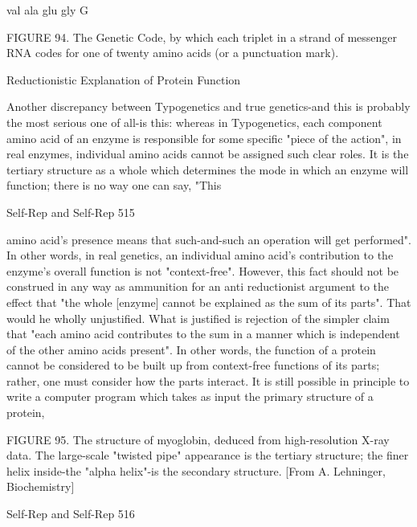 {                        val       ala   glu     gly          G




FIGURE 94. The Genetic Code, by which each triplet in a strand of messenger RNA codes
for one of twenty amino acids (or a punctuation mark).

                     Reductionistic Explanation of Protein Function

Another discrepancy between Typogenetics and true genetics-and this is probably the most
serious one of all-is this: whereas in Typogenetics, each component amino acid of an enzyme
is responsible for some specific "piece of the action", in real enzymes, individual amino acids
cannot be assigned such clear roles. It is the tertiary structure as a whole which determines
the mode in which an enzyme will function; there is no way one can say, "This




Self-Rep and Self-Rep                                                                      515

amino acid's presence means that such-and-such an operation will get performed". In other
words, in real genetics, an individual amino acid's contribution to the enzyme's overall
function is not "context-free". However, this fact should not be construed in any way as
ammunition for an anti reductionist argument to the effect that "the whole [enzyme] cannot
be explained as the sum of its parts". That would he wholly unjustified. What is justified is
rejection of the simpler claim that "each amino acid contributes to the sum in a manner which
is independent of the other amino acids present". In other words, the function of a protein
cannot be considered to be built up from context-free functions of its parts; rather, one must
consider how the parts interact. It is still possible in principle to write a computer program
which takes as input the primary structure of a protein,

FIGURE 95. The structure of myoglobin, deduced from high-resolution X-ray data. The
large-scale "twisted pipe" appearance is the tertiary structure; the finer helix inside-the
"alpha helix"-is the secondary structure. [From A. Lehninger, Biochemistry]




Self-Rep and Self-Rep                                                                     516

}
